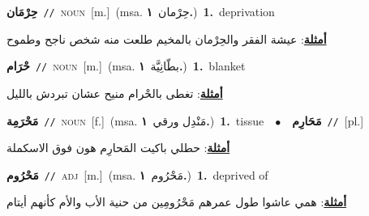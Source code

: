 \documentclass[10pt,a4paper,twoside]{article} %
\begin{document}
\begin{multicols}{2}
{\setlength\topsep{0pt}\textbf{\foreignlanguage{arabic}{حِرْمَان}}\ {\color{gray}\texttt{//}\color{black}}\ \textsc{noun}\ [m.]\ \color{gray}(msa. \foreignlanguage{arabic}{حِرْمان}~\foreignlanguage{arabic}{\textbf{١.}})\color{black}\ \textbf{1.}~deprivation\  \begin{flushright}\color{gray}\foreignlanguage{arabic}{\textbf{\underline{\foreignlanguage{arabic}{أمثلة}}}: عيشة الفقر والحِرْمان بالمخيم طلعت منه شخص ناجح وطموح}\end{flushright}\color{black}} \vspace{2mm}

{\setlength\topsep{0pt}\textbf{\foreignlanguage{arabic}{حْرَام}}\ {\color{gray}\texttt{//}\color{black}}\ \textsc{noun}\ [m.]\ \color{gray}(msa. \foreignlanguage{arabic}{بطّانِيَّة}~\foreignlanguage{arabic}{\textbf{١.}})\color{black}\ \textbf{1.}~blanket\  \begin{flushright}\color{gray}\foreignlanguage{arabic}{\textbf{\underline{\foreignlanguage{arabic}{أمثلة}}}: تغطى بالحْرام منيح عشان تبردش بالليل}\end{flushright}\color{black}} \vspace{2mm}

{\setlength\topsep{0pt}\textbf{\foreignlanguage{arabic}{مَحْرَمِة}}\ {\color{gray}\texttt{//}\color{black}}\ \textsc{noun}\ [f.]\ \color{gray}(msa. \foreignlanguage{arabic}{مَنْدِل ورقي}~\foreignlanguage{arabic}{\textbf{١.}})\color{black}\ \textbf{1.}~tissue\ \ $\bullet$\ \ \setlength\topsep{0pt}\textbf{\foreignlanguage{arabic}{مَحَارِم}}\ {\color{gray}\texttt{//}\color{black}}\ [pl.]\  \begin{flushright}\color{gray}\foreignlanguage{arabic}{\textbf{\underline{\foreignlanguage{arabic}{أمثلة}}}: حطلي باكيت المَحارِم هون فوق الاسكملة}\end{flushright}\color{black}} \vspace{2mm}

{\setlength\topsep{0pt}\textbf{\foreignlanguage{arabic}{مَحْرُوم}}\ {\color{gray}\texttt{//}\color{black}}\ \textsc{adj}\ [m.]\ \color{gray}(msa. \foreignlanguage{arabic}{مَحْرُوم}~\foreignlanguage{arabic}{\textbf{١.}})\color{black}\ \textbf{1.}~deprived of\  \begin{flushright}\color{gray}\foreignlanguage{arabic}{\textbf{\underline{\foreignlanguage{arabic}{أمثلة}}}: همي عاشوا طول عمرهم مَحْرُومِين من حنية الأب والأم كأنهم أيتام}\end{flushright}\color{black}} \vspace{2mm}


\end{multicols}
\end{document}
